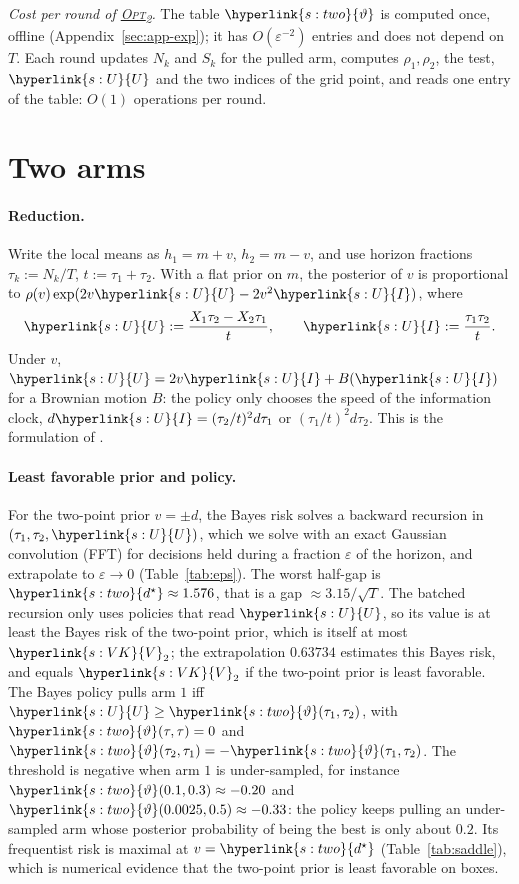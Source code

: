 \documentclass[11pt]{article}
\newcommand{\dt}[1]{\hypertarget{#1}{}}
\DeclareRobustCommand{\sy}[2]{{\hyperlink{#1}{#2}}}
\newcommand{\1}{\mathbf{1}}
\newcommand{\VK}{\sy{s:VK}{V}}
\newcommand{\OPT}{\sy{alg:opt}{\textsc{Opt}\textsubscript{2}}}
\newcommand{\Ud}{\sy{s:U}{U}}
\newcommand{\Id}{\sy{s:U}{I}}
\newcommand{\dst}{\sy{s:two}{d^\star}}
\newcommand{\thr}{\sy{s:two}{\vartheta}}
\begin{document}
\noindent\emph{Cost per round of \OPT.} The table $\thr$ is computed once, offline (Appendix~\ref{sec:app-exp}); it has $O(\varepsilon^{-2})$ entries and does not depend on
$T$. Each round updates $N_k$ and $S_k$ for the pulled arm, computes $\rho_1,\rho_2$, the test, $\Ud$ and the two indices of the grid point, and reads one entry of
the table: $O(1)$ operations per round.



\section{Two arms}\label{sec:two}

\paragraph{Reduction.}\dt{s:U} Write the local means as $h_1=m+v$, $h_2=m-v$, and use horizon fractions $\tau_k:=N_k/T$, $t:=\tau_1+\tau_2$. With a flat prior on $m$, the
posterior of $v$ is proportional to $\rho(v)\exp(2v\Ud-2v^2\Id)$, where
\[
\Ud:=\frac{X_1\tau_2-X_2\tau_1}t,\qquad \Id:=\frac{\tau_1\tau_2}t .
\]
Under $v$, $\Ud=2v\Id+B(\Id)$ for a Brownian motion $B$: the policy only chooses the speed of the information clock, $d\Id=(\tau_2/t)^2d\tau_1$ or $(\tau_1/t)^2d\tau_2$.
This is the formulation of \citet{Kol17}.

\paragraph{Least favorable prior and policy.}\dt{s:two} For the two-point prior $v=\pm d$, the Bayes risk solves a backward recursion in $(\tau_1,\tau_2,\Ud)$, which we solve with
an exact Gaussian convolution (FFT) for decisions held during a fraction $\varepsilon$ of the horizon, and extrapolate to $\varepsilon\to0$ (Table~\ref{tab:eps}). The worst half-gap
is $\dst\approx1.576$, that is a gap $\approx3.15/\sqrt T$. The batched recursion only uses policies that read $\Ud$, so its value is at least the Bayes risk of
the two-point prior, which is itself at most $\VK_2$; the extrapolation $0.63734$ estimates this Bayes risk, and equals $\VK_2$ if the two-point prior is least favorable.
The Bayes policy pulls arm $1$ iff $\Ud\ge\thr(\tau_1,\tau_2)$, with $\thr(\tau,\tau)=0$ and
$\thr(\tau_2,\tau_1)=-\thr(\tau_1,\tau_2)$. The threshold is negative when arm $1$ is under-sampled, for instance $\thr(0.1,0.3)\approx-0.20$ and $\thr(0.0025,0.5)\approx-0.33$:
the policy keeps pulling an under-sampled arm whose posterior probability of being the best is only about $0.2$. Its frequentist risk is maximal at $v=\dst$
(Table~\ref{tab:saddle}), which is numerical evidence that the two-point prior is least favorable on boxes.
\end{document}
